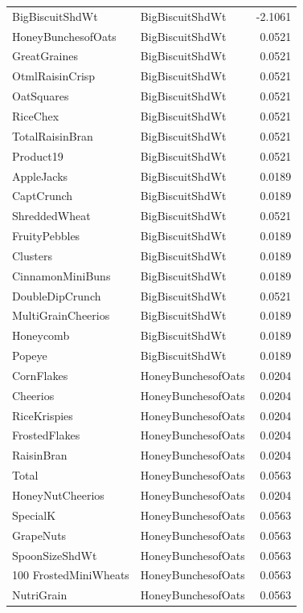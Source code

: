 \begin{longtable}{llr}
BigBiscuitShdWt & BigBiscuitShdWt & -2.1061 \\
HoneyBunchesofOats & BigBiscuitShdWt & 0.0521 \\
GreatGraines & BigBiscuitShdWt & 0.0521 \\
OtmlRaisinCrisp & BigBiscuitShdWt & 0.0521 \\
OatSquares & BigBiscuitShdWt & 0.0521 \\
RiceChex & BigBiscuitShdWt & 0.0521 \\
TotalRaisinBran & BigBiscuitShdWt & 0.0521 \\
Product19 & BigBiscuitShdWt & 0.0521 \\
AppleJacks & BigBiscuitShdWt & 0.0189 \\
CaptCrunch & BigBiscuitShdWt & 0.0189 \\
ShreddedWheat & BigBiscuitShdWt & 0.0521 \\
FruityPebbles & BigBiscuitShdWt & 0.0189 \\
Clusters & BigBiscuitShdWt & 0.0189 \\
CinnamonMiniBuns & BigBiscuitShdWt & 0.0189 \\
DoubleDipCrunch & BigBiscuitShdWt & 0.0521 \\
MultiGrainCheerios & BigBiscuitShdWt & 0.0189 \\
Honeycomb & BigBiscuitShdWt & 0.0189 \\
Popeye & BigBiscuitShdWt & 0.0189 \\
CornFlakes & HoneyBunchesofOats & 0.0204 \\
Cheerios & HoneyBunchesofOats & 0.0204 \\
RiceKrispies & HoneyBunchesofOats & 0.0204 \\
FrostedFlakes & HoneyBunchesofOats & 0.0204 \\
RaisinBran & HoneyBunchesofOats & 0.0204 \\
Total & HoneyBunchesofOats & 0.0563 \\
HoneyNutCheerios & HoneyBunchesofOats & 0.0204 \\
SpecialK & HoneyBunchesofOats & 0.0563 \\
GrapeNuts & HoneyBunchesofOats & 0.0563 \\
SpoonSizeShdWt & HoneyBunchesofOats & 0.0563 \\
100%
FrostedMiniWheats & HoneyBunchesofOats & 0.0563 \\
NutriGrain & HoneyBunchesofOats & 0.0563 \\

\end{longtable}
